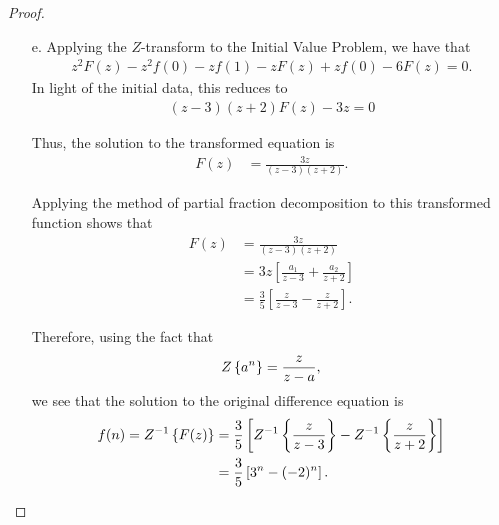 \begin{proof}
\begin{enumerate}
    \item[e.] Applying the $Z$-transform to the Initial Value Problem, we have that
      \begin{align*}
        z^2 F(z) - z^2f(0) - z f(1) - z F(z) + z f(0) - 6F(z) = 0.
      \end{align*}
      In light of the initial data, this reduces to
      \begin{align*}
        \left(z-3\right)\left(z+2\right) F(z) -3z = 0
      \end{align*}

      Thus, the solution to the transformed equation is
      \begin{align*}
        F(z) &= \frac{3z}{(z-3)(z+2)}.
      \end{align*}

      Applying the method of partial fraction decomposition to this transformed function shows that
      \begin{align*}
        F(z)
        &= \frac{3z}{(z-3)(z+2)} \\
        &= 3z\left[\frac{a_1}{z-3}+\frac{a_2}{z+2}\right] \\
        &= \frac{3}{5}\left[\frac{z}{z-3}-\frac{z}{z+2}\right].
      \end{align*}

      Therefore, using the fact that
      \begin{align*}
        Z\left\{ {a^n} \right\} = \frac{z}{z-a},
      \end{align*}
      we see that the solution to the original difference equation is
      \begin{align*}
        f(n) = Z^{-1}\left\{ {F(z)} \right\}
        &= \frac{3}{5}\left[Z^{-1}\left\{ {\frac{z}{z-3}} \right\}-Z^{-1}\left\{ {\frac{z}{z+2}} \right\}\right] \\
        &= \frac{3}{5}\left[3^n - (-2)^n\right].
      \end{align*}
  \end{enumerate}
\end{proof}
\newpage
